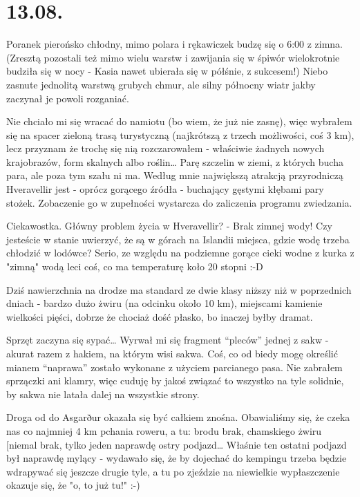 \chapter*{13.08.}

Poranek pierońsko chłodny, mimo polara i rękawiczek budzę się o 6:00 z zimna. (Zresztą pozostali też mimo wielu warstw i zawijania się w śpiwór wielokrotnie budziła się w nocy - Kasia nawet ubierała się w półśnie, z sukcesem!) Niebo zasnute jednolitą warstwą grubych chmur, ale silny północny wiatr jakby zaczynał je powoli rozganiać.

Nie chciało mi się wracać do namiotu (bo wiem, że już nie zasnę), więc wybrałem się na spacer zieloną trasą turystyczną (najkrótszą z trzech możliwości, coś 3 km), lecz przyznam że trochę się nią rozczarowałem - właściwie żadnych nowych krajobrazów, form skalnych albo roślin… Parę szczelin w ziemi, z których bucha para, ale poza tym szału ni ma. Według mnie największą atrakcją przyrodniczą Hveravellir jest - oprócz gorącego źródła - buchający gęstymi kłębami pary stożek. Zobaczenie go w zupełności wystarcza do zaliczenia programu zwiedzania.

Ciekawostka. Główny problem życia w Hveravellir? - Brak zimnej wody! Czy jesteście w stanie uwierzyć, że są w górach na Islandii miejsca, gdzie wodę trzeba chłodzić w lodówce? Serio, ze względu na podziemne gorące cieki wodne z kurka z "zimną" wodą leci coś, co ma temperaturę koło 20 stopni :-D

Dziś nawierzchnia na drodze ma standard ze dwie klasy niższy niż w poprzednich dniach - bardzo dużo żwiru (na odcinku około 10 km), miejscami kamienie wielkości pięści, dobrze że chociaż dość płasko, bo inaczej byłby dramat.


Sprzęt zaczyna się sypać… Wyrwał mi się fragment “pleców” jednej z sakw - akurat razem z hakiem, na którym wisi sakwa. Coś, co od biedy mogę określić mianem “naprawa” zostało wykonane z użyciem parcianego pasa. Nie zabrałem sprzączki ani klamry, więc cuduję by jakoś związać to wszystko na tyle solidnie, by sakwa nie latała dalej na wszystkie strony.

Droga od  do Asgarður okazała się być całkiem znośna. Obawialiśmy się, że czeka nas co najmniej 4 km pchania roweru, a tu: brodu brak, chamskiego żwiru [niemal brak, tylko jeden naprawdę ostry podjazd… Właśnie ten ostatni podjazd był naprawdę mylący - wydawało się, że by dojechać do kempingu trzeba będzie wdrapywać się jeszcze drugie tyle, a tu po zjeździe na niewielkie wypłaszczenie okazuje się, że "o, to już tu!" :-)


